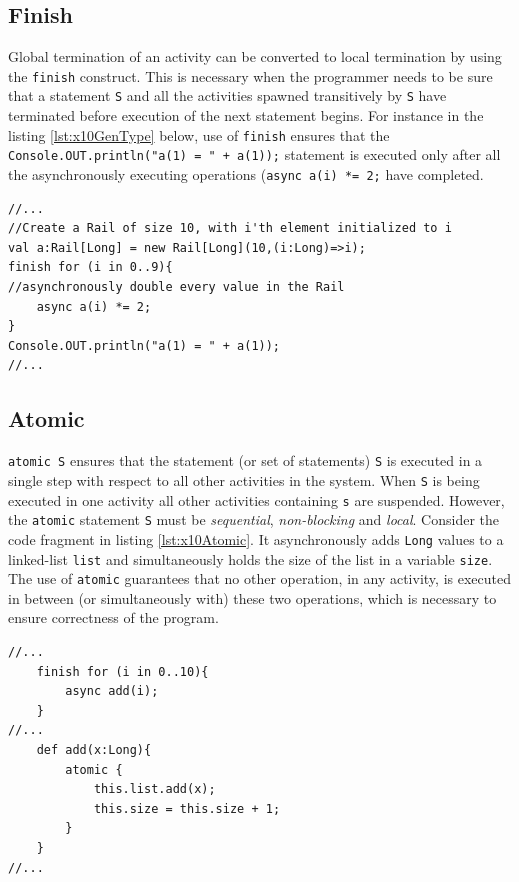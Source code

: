 \subsection{Finish} Global termination of an activity can be converted to local
termination by using the \texttt{finish} construct. This is necessary when the
programmer needs to be sure that a statement \texttt{S} and all the activities
spawned transitively by \texttt{S} have terminated before execution of the next
statement begins. For instance in the listing \ref{lst:x10GenType} below, use of
\texttt{finish} ensures that the \texttt{Console.OUT.println("a(1) = " + a(1));}
statement is executed only after all the asynchronously executing operations
(\texttt{async a(i) *= 2;} have completed.

\begin{lstlisting}[caption={Example use of \texttt{finish} construct},label={lst:x10GenType},language=x10,numbers=none]
//...
//Create a Rail of size 10, with i'th element initialized to i 
val a:Rail[Long] = new Rail[Long](10,(i:Long)=>i);
finish for (i in 0..9){
//asynchronously double every value in the Rail
	async a(i) *= 2;
}
Console.OUT.println("a(1) = " + a(1));
//...
\end{lstlisting}

\subsection{Atomic} \texttt{atomic S} ensures that the statement (or set of
statements) \texttt{S} is
executed in a single step with respect to all other activities in the system.
When \texttt{S} is being executed in one activity all other activities
containing \texttt{s} are suspended. However, the \texttt{atomic} statement 
\texttt{S} must be 
\emph{sequential}, \emph{non-blocking} and \emph{local}. Consider the code
fragment in listing \ref{lst:x10Atomic}. It asynchronously adds \texttt{Long}
values to a linked-list \texttt{list} and simultaneously holds the size of the
list in a variable \texttt{size}. The use of \texttt{atomic} guarantees that no
other operation, in any activity, is executed in between (or simultaneously
with) these two operations, which is necessary to ensure correctness of the
program.

\begin{lstlisting}[caption={Example use of \texttt{atomic}
construct},label={lst:x10Atomic},language=x10,numbers=none]
//...
	finish for (i in 0..10){
		async add(i);
	}
//...
	def add(x:Long){
		atomic {
			this.list.add(x);
			this.size = this.size + 1;
		}
	}
//...
\end{lstlisting}

